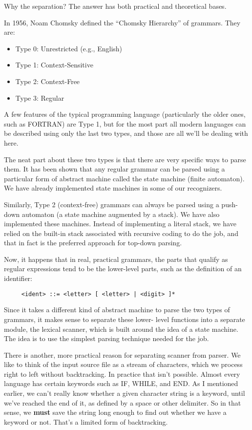 Why  the  separation?  The  answer  has  both  practical  and theoretical bases.

In  1956, Noam Chomsky  defined  the  ``Chomsky Hierarchy'' of grammars. They are:

\begin{itemize}
\item	Type 0:  Unrestricted (e.g., English)
\item	Type 1:  Context-Sensitive
\item	Type 2:  Context-Free
\item	Type 3:  Regular
\end{itemize}

A few features of the typical programming  language (particularly the older ones, such as FORTRAN) are Type  1, but  for  the most part  all  modern  languages can be described using only the last two types, and those are all we'll be dealing with here.

The  neat  part about these two types  is  that  there  are  very specific ways to parse them. It has been shown that  any regular grammar can be parsed using a particular form of abstract machine called the state machine (finite  automaton). We  have already implemented state machines in some of our recognizers.

Similarly, Type 2 (context-free) grammars  can  always  be parsed using  a  push-down  automaton (a state machine  augmented  by  a stack). We have  also  implemented  these  machines. Instead of implementing  a literal stack, we have  relied  on  the  built-in stack associated with recursive coding to do the job, and that in fact is the preferred approach for top-down parsing.

Now, it happens that in  real, practical grammars, the parts that qualify as  regular expressions tend to be the lower-level parts, such as the definition of an identifier:

\begin{verbatim}
     <ident> ::= <letter> [ <letter> | <digit> ]*
\end{verbatim}

Since it takes a different kind of abstract machine to  parse the two  types  of  grammars, it makes sense to separate these lower- level functions into  a  separate  module, the  lexical scanner, which is built around the idea of a state machine. The idea is to use the simplest parsing technique needed for the job.

There is another, more practical  reason  for  separating scanner from  parser. We like to think of the input source  file  as  a stream  of characters, which we process  right  to  left  without backtracking. In practice that  isn't  possible. Almost every language has certain keywords such as  IF, WHILE, and END. As I mentioned  earlier, we  can't  really  know  whether  a  given character string is a keyword, until we've reached the end of it, as defined by a space or other delimiter. So  in  that sense, we {\bfseries must}  save  the  string long enough to find out whether we have a keyword or not. That's a limited form of backtracking.

